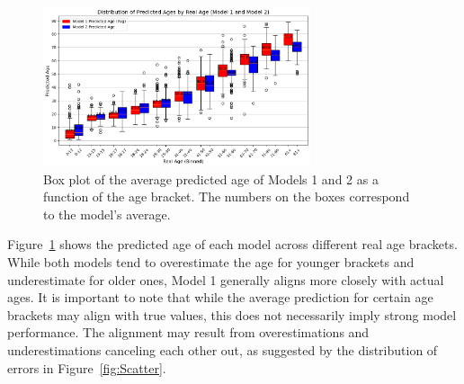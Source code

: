 \documentclass[10pt]{article}
\begin{document}
\begin{figure}[h]
    \centering
    \includegraphics[width=0.7\textwidth]{images/3_Box_Real_vs_prediction_dorpnan_DensePlotGrid.png}
    \caption{Box plot of the average predicted age of Models 1 and 2 as a function of the age bracket. The numbers on the boxes correspond to the model's average.}
    \label{fig:Box}
\end{figure}



Figure~\ref{fig:Box} shows the predicted age of each model across different real age brackets. While both models tend to overestimate the age for younger brackets and underestimate for older ones, Model 1 generally aligns more closely with actual ages.
It is important to note that while the average prediction for certain age brackets may align with true values, this does not necessarily imply strong model performance. The alignment may result from overestimations and underestimations canceling each other out, as suggested by the distribution of errors in Figure~\ref{fig:Scatter}.

\end{document}
